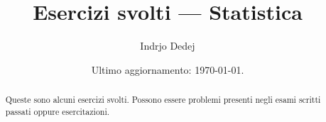 


\title{Esercizi svolti --- Statistica}
\author{Indrjo Dedej}
\date{Ultimo aggiornamento: \today{}.}



\maketitle

\begin{abstract}
Queste sono alcuni esercizi svolti. Possono essere problemi presenti negli esami scritti passati oppure esercitazioni.
\end{abstract}

\tableofcontents








